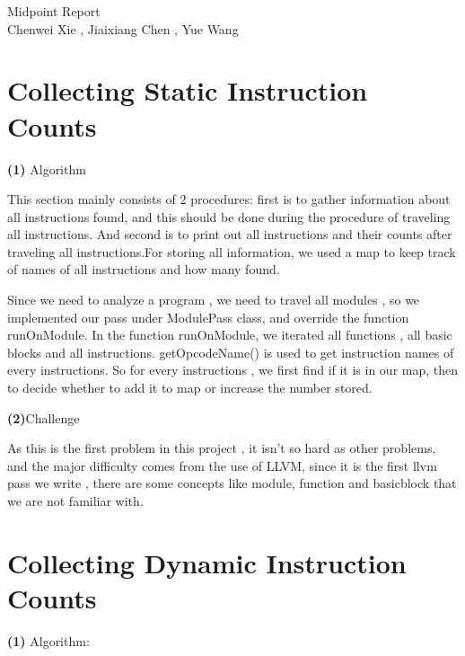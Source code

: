 \documentclass{article}
\renewcommand{\part}[1] {\vspace{.10in} {\bf (#1)}}
\newcommand{\myname}{Chenwei Xie , Jiaixiang Chen , Yue Wang}
\begin{document}
\thispagestyle{plain}
\begin{center}                  %
{\Large Midpoint Report } \\
\myname \\
\end{center}


\section{Collecting Static Instruction Counts}

\part{1} Algorithm
	

This section mainly consists of 2 procedures: first is to gather information about all instructions found, and this should be done during the procedure of traveling all instructions. And second is to print out all instructions and their counts after traveling all instructions.For storing all information, we used a map to keep track of names of all instructions and how many found.

Since we need to analyze a program , we need to travel all modules , so we implemented our pass under ModulePass class, and override the function runOnModule. In the function runOnModule, we iterated all functions , all basic blocks and all instructions. getOpcodeName() is used to get instruction names of every instructions. So for every instructions , we first find if it is in our map, then to decide whether to add it to map or increase the number stored.
	
\part{2}Challenge
	

As this is the first problem in this project , it isn't so hard as other problems, and the major difficulty comes from the use of LLVM, since it is the first llvm pass we write , there are some concepts like module, function and basicblock that we are not familiar with.




\section{Collecting Dynamic Instruction Counts}

\part{1} Algorithm:
\end{document}
